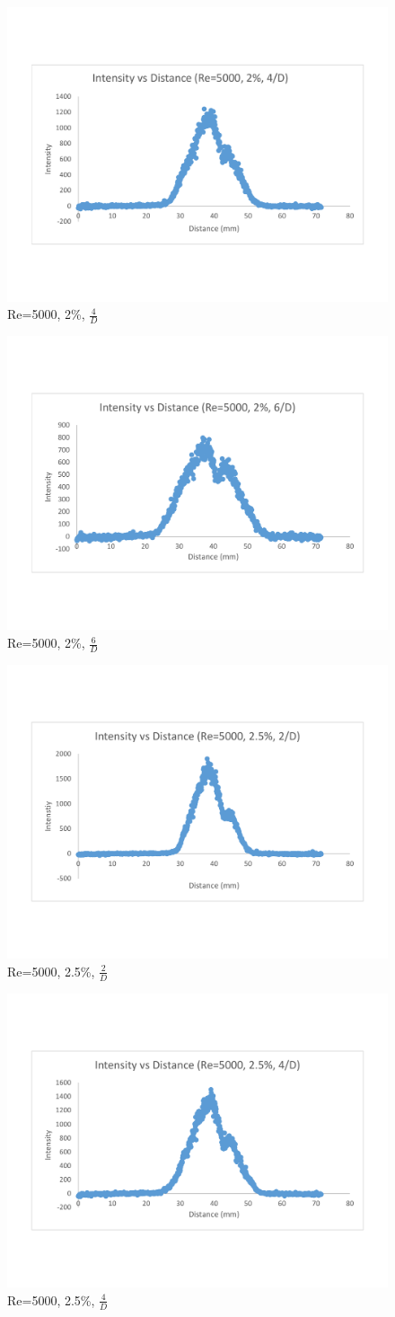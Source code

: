 \documentclass[preview,12pt]{article}
\begin{document}
\begin{figure}[h]
    \centering
    \includegraphics[width=0.55\linewidth]{RE-5000-20-cs4D.pdf}
    \caption{{\footnotesize Re=5000, 2\%, $\frac{4}{D}$ }}
\end{figure}
\begin{figure}[h]
    \centering
    \includegraphics[width=0.55\linewidth]{RE-5000-20-cs6D.pdf}
    \caption{{\footnotesize Re=5000, 2\%, $\frac{6}{D}$ }}
\end{figure}
\begin{figure}[h]
    \centering
    \includegraphics[width=0.55\linewidth]{RE-5000-25-cs2D.pdf}
    \caption{{\footnotesize Re=5000, 2.5\%, $\frac{2}{D}$ }}
\end{figure}
\begin{figure}[h]
    \centering
    \includegraphics[width=0.55\linewidth]{RE-5000-25-cs4D.pdf}
    \caption{{\footnotesize Re=5000, 2.5\%, $\frac{4}{D}$ }}
\end{figure}
\end{document}
